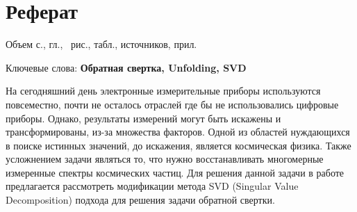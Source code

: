 \documentclass[a4paper,12pt]{diplom}
\begin{document}










\maketitle
\chapter*{Реферат}

Объем  с.,  гл., \totalfigures\ рис.,
 табл.,  источников,  прил.

\medskip

Ключевые слова: \textbf{Обратная свертка, Unfolding, SVD}

\medskip

На сегодняшний день электронные измерительные приборы используются повсеместно, почти не осталось отраслей где бы не использовались цифровые приборы. 
Однако, результаты измерений могут быть искажены и трансформированы, из-за множества факторов. Одной из областей нуждающихся в поиске истинных 
значений, до искажения, является космическая физика. Также усложнением задачи являться то, что нужно восстанавливать многомерные измеренные спектры 
космических частиц. Для решения данной задачи в работе предлагается рассмотреть модификации метода SVD (Singular Value Decomposition) подхода для 
решения задачи обратной свертки.
\end{document}
